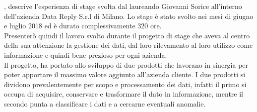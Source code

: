 
, descrive	l'esperienza di stage svolta dal laureando Giovanni Sorice all'interno dell'azienda Data Reply S.r.l di Milano. Lo stage è stato svolto nei mesi di giugno e luglio 2018 ed è durato complessivamente 320 ore.
\\
Presenterò quindi il lavoro svolto durante il progetto di stage che aveva al centro della sua attenzione la gestione dei dati, dal loro rilevamento al loro utilizzo come informazione e quindi bene prezioso per ogni azienda.
\\
Il progetto, ha portato allo sviluppo di due prodotti che lavorano in sinergia per poter apportare il massimo valore aggiunto all'azienda cliente.
I due prodotti si dividono prevalentemente per scopo e processamento dei dati, infatti il primo si occupa di acquisire, conservare e trasformare il dato in informazione, mentre il secondo punta a classificare i dati e a cercarne eventuali anomalie.

